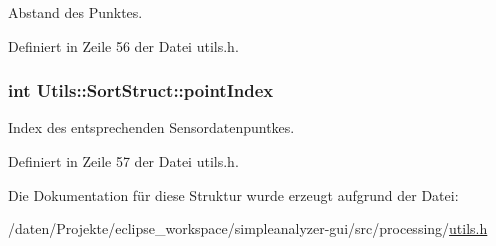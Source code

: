 Abstand des Punktes. 



Definiert in Zeile 56 der Datei utils.\-h.

\hypertarget{structUtils_1_1SortStruct_ad470a3f9a230e66a47fd022bf7a4a70e}{
\subsubsection[{point\-Index}]{\setlength{\rightskip}{0pt plus 5cm}int Utils\-::\-Sort\-Struct\-::point\-Index}}\label{structUtils_1_1SortStruct_ad470a3f9a230e66a47fd022bf7a4a70e}


Index des entsprechenden Sensordatenpuntkes. 



Definiert in Zeile 57 der Datei utils.\-h.



Die Dokumentation für diese Struktur wurde erzeugt aufgrund der Datei\-:\begin{DoxyCompactItemize}
\item 
/daten/\-Projekte/eclipse\-\_\-workspace/simpleanalyzer-\/gui/src/processing/\hyperlink{simpleanalyzer-gui_2src_2processing_2utils_8h}{utils.\-h}\end{DoxyCompactItemize}
